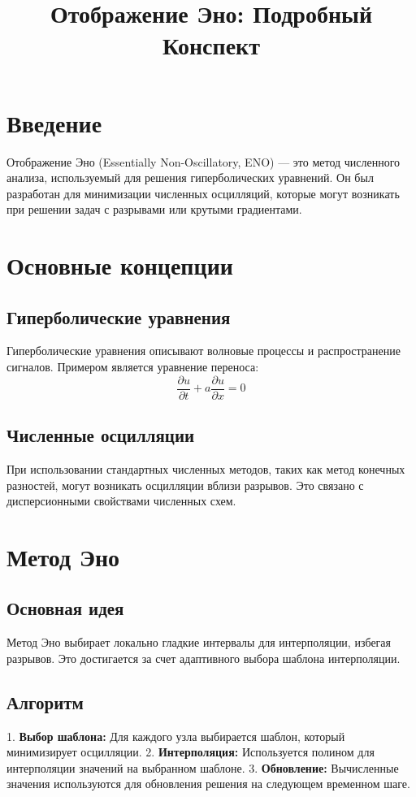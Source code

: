 \documentclass[a4paper,12pt]{article}
\title{Отображение Эно: Подробный Конспект}
\author{}
\date{}
\begin{document}
\maketitle

\tableofcontents

\section{Введение}
Отображение Эно (Essentially Non-Oscillatory, ENO) — это метод численного анализа, используемый для решения гиперболических уравнений. Он был разработан для минимизации численных осцилляций, которые могут возникать при решении задач с разрывами или крутыми градиентами.

\section{Основные концепции}
\subsection{Гиперболические уравнения}
Гиперболические уравнения описывают волновые процессы и распространение сигналов. Примером является уравнение переноса:
\begin{equation}
\frac{\partial u}{\partial t} + a \frac{\partial u}{\partial x} = 0
\end{equation}

\subsection{Численные осцилляции}
При использовании стандартных численных методов, таких как метод конечных разностей, могут возникать осцилляции вблизи разрывов. Это связано с дисперсионными свойствами численных схем.

\section{Метод Эно}
\subsection{Основная идея}
Метод Эно выбирает локально гладкие интервалы для интерполяции, избегая разрывов. Это достигается за счет адаптивного выбора шаблона интерполяции.

\subsection{Алгоритм}
1. \textbf{Выбор шаблона:} Для каждого узла выбирается шаблон, который минимизирует осцилляции.
2. \textbf{Интерполяция:} Используется полином для интерполяции значений на выбранном шаблоне.
3. \textbf{Обновление:} Вычисленные значения используются для обновления решения на следующем временном шаге.
\end{document}
